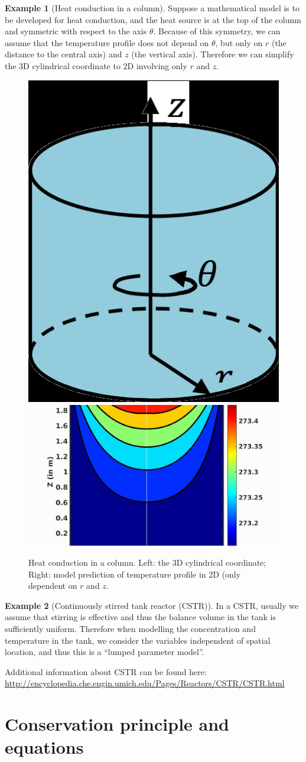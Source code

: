 \documentclass[a4paper,11pt]{article}
\theoremstyle{definition}
\newtheorem{exmp}{Example}[section]
\begin{document}
\begin{exmp}[Heat conduction in a column]
\label{exmp:cylin}
Suppose a mathematical model is to be developed for heat conduction, and the heat source is at the top of the column and symmetric
with respect to the axis $\theta$. Because of this symmetry, we can assume that the temperature profile
does not depend on $\theta$, but only on $r$ (the distance to the central axis) and $z$ (the vertical axis).
Therefore we can simplify the 3D cylindrical coordinate to 2D involving only $r$ and $z$.

\begin{figure} [!h]
 \begin{center}
	\includegraphics[width=.15\textwidth]{cylin_1} 	\hspace{1cm}
	\includegraphics[width=.35\textwidth]{cylin_2}
 \end{center}
 \caption{Heat conduction in a column. Left: the 3D cylindrical coordinate; 
 	Right: model prediction of temperature profile in 2D (only dependent on $r$ and $z$.} 
 \label{fig:cylin}
\end{figure}

\end{exmp}


\begin{exmp}[Continuously stirred tank reactor (CSTR)]
\label{exmp:cstr}
In a CSTR, usually we assume that stirring is effective and thus the balance volume in the tank
is sufficiently uniform. Therefore when modelling the concentration and temperature in the tank, 
we consider the variables independent of spatial location, and thus this is a ``lumped parameter model''.

Additional information about CSTR can be found here: 
\url{http://encyclopedia.che.engin.umich.edu/Pages/Reactors/CSTR/CSTR.html}

\end{exmp}


\section{Conservation principle and equations}
\end{document}
